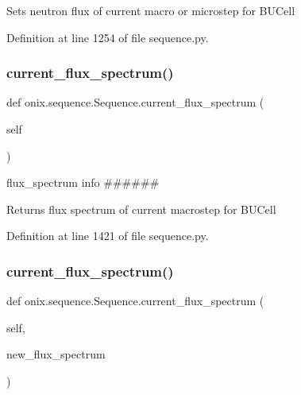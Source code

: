 \begin{DoxyVerb}Sets neutron flux of current macro or microstep
for BUCell\end{DoxyVerb}
 

Definition at line 1254 of file sequence.\+py.

\mbox{\label{classonix_1_1sequence_1_1Sequence_ad182d0b55e99defe329af078234141d6}} 
\subsubsection{\texorpdfstring{current\+\_\+flux\+\_\+spectrum()}{current\_flux\_spectrum()}\hspace{0.1cm}{\footnotesize\ttfamily [1/2]}}
{\footnotesize\ttfamily def onix.\+sequence.\+Sequence.\+current\+\_\+flux\+\_\+spectrum (\begin{DoxyParamCaption}\item[{}]{self }\end{DoxyParamCaption})}



flux\+\_\+spectrum info \#\#\#\#\#\# 

\begin{DoxyVerb}Returns flux spectrum of current macrostep
for BUCell\end{DoxyVerb}
 

Definition at line 1421 of file sequence.\+py.

\mbox{\label{classonix_1_1sequence_1_1Sequence_a9140653c7614eedb267aec10cc5b1862}} 
\subsubsection{\texorpdfstring{current\+\_\+flux\+\_\+spectrum()}{current\_flux\_spectrum()}\hspace{0.1cm}{\footnotesize\ttfamily [2/2]}}
{\footnotesize\ttfamily def onix.\+sequence.\+Sequence.\+current\+\_\+flux\+\_\+spectrum (\begin{DoxyParamCaption}\item[{}]{self,  }\item[{}]{new\+\_\+flux\+\_\+spectrum }\end{DoxyParamCaption})}

